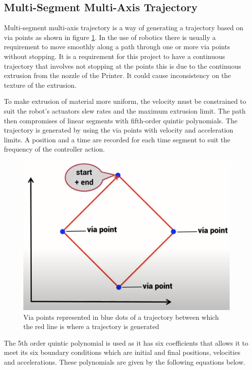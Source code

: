 \documentclass{UoNMCHA}
\numberwithin{equation}{section}
\begin{document}
	\subsection{Multi-Segment Multi-Axis Trajectory}
Multi-segment multi-axis trajectory is a way of generating a trajectory based on via points as shown in figure \ref{figs/Picture10}. In the use of robotics there is usually a requirement to move smoothly along a path through one or more via points without stopping. It is a requirement for this project to have a continuous trajectory that involves not stopping at the points this is due to the continuous extrusion from the nozzle of the Printer. It could cause inconsistency on the texture of the extrusion.  \par
To make extrusion of material more uniform, the velocity must be constrained to suit the robot's actuators slew rates and the maximum extrusion limit. The path then compromises of linear segments with fifth-order quintic polynomials. The trajectory is generated by using the via points with velocity and acceleration limits. A position and a time are recorded for each time segment to suit the frequency of the controller action.
	\begin{figure}[H]
		\begin{center}
			\includegraphics[width=.6\linewidth]{figs/Picture10}
			\caption{Via points represented in blue dots of a trajectory between which the red line is where a trajectory is generated \cite{corke_2017_robotics}}
			\label{figs/Picture10}
		\end{center}
	\end{figure}
	
	
	The 5th order quintic polynomial is used as it has six coefficients that allows it to meet its six boundary conditions which are initial and final positions, velocities and accelerations. These polynomials are
	given by the following equations below.
	
\end{document}

